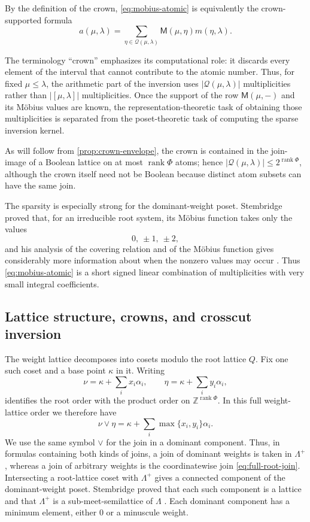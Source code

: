 \documentclass[11pt]{article}
\theoremstyle{definition}
\theoremstyle{remark}
\newcommand{\Raiz}{\Phi}
\newcommand{\RaizReti}{Q}
\newcommand{\Pesos}{\Lambda}
\newcommand{\QO}{\mathscr{Q}}
\newcommand{\Mu}{\mathsf{M}}
\newcommand{\Z}{\mathbb Z}
\begin{document}
By the definition of the crown, \eqref{eq:mobius-atomic} is equivalently the
crown-supported formula
\begin{equation}\label{eq:crown-formula}
   a(\mu,\lambda)
      =\sum_{\eta\in\QO(\mu,\lambda)}
          \Mu(\mu,\eta)m(\eta,\lambda).
\end{equation}

The terminology ``crown'' emphasizes its computational role: it discards every
element of the interval that cannot
contribute to the atomic number.  Thus, for fixed $\mu\le\lambda$, the
arithmetic part of the inversion uses $|\QO(\mu,\lambda)|$ multiplicities rather
than $|[\mu,\lambda]|$ multiplicities.  Once the support of the row
$\Mu(\mu,-)$ and its M\"obius values are known, the representation-theoretic
task of obtaining those multiplicities is separated from the poset-theoretic
task of computing the sparse inversion kernel.

As will follow from \cref{prop:crown-envelope}, the crown is contained in the
join-image of a Boolean lattice on at most $\operatorname{rank}\Raiz$ atoms;
hence $|\QO(\mu,\lambda)|\le2^{\operatorname{rank}\Raiz}$, although the
crown itself need not be Boolean because distinct atom subsets can have the
same join.

The sparsity is especially strong for the dominant-weight poset.  Stembridge
proved that, for an irreducible root system, its M\"obius function takes only
the values
\[
       0,\ \pm1,\ \pm2,
\]
and his analysis of the covering relation and of the M\"obius function gives
considerably more information about when the nonzero values may occur
\cite[Sections~2 and~4]{Stembridge}.  Thus \eqref{eq:mobius-atomic} is a short
signed linear combination of multiplicities with very small integral
coefficients.


\subsection{Lattice structure, crowns, and crosscut inversion}
The weight lattice decomposes into cosets modulo the root lattice $\RaizReti$.
Fix one such coset and a base point $\kappa$ in it.  Writing
\[
 \nu=\kappa+\sum_i x_i\alpha_i,
 \qquad
 \eta=\kappa+\sum_i y_i\alpha_i,
\]
identifies the root order with the product order on $\Z^{\operatorname{rank}\Raiz}$.
In this full weight-lattice order we therefore have
\begin{equation}\label{eq:full-root-join}
 \nu\vee\eta
   =\kappa+\sum_i\max\{x_i,y_i\}\alpha_i.
\end{equation}
We use the same symbol $\vee$ for the join in a dominant component.  Thus, in
formulas containing both kinds of joins, a join of dominant weights is taken in
$\Pesos^+$, whereas a join of arbitrary weights is the coordinatewise join
\eqref{eq:full-root-join}.  Intersecting a root-lattice coset
with $\Pesos^+$ gives a connected component of the dominant-weight poset.
Stembridge proved that each such component is a lattice and that $\Pesos^+$
is a sub-meet-semilattice of $\Pesos$ \cite{Stembridge}.  Each dominant
component has a minimum element, either $0$ or a minuscule weight.
\end{document}
